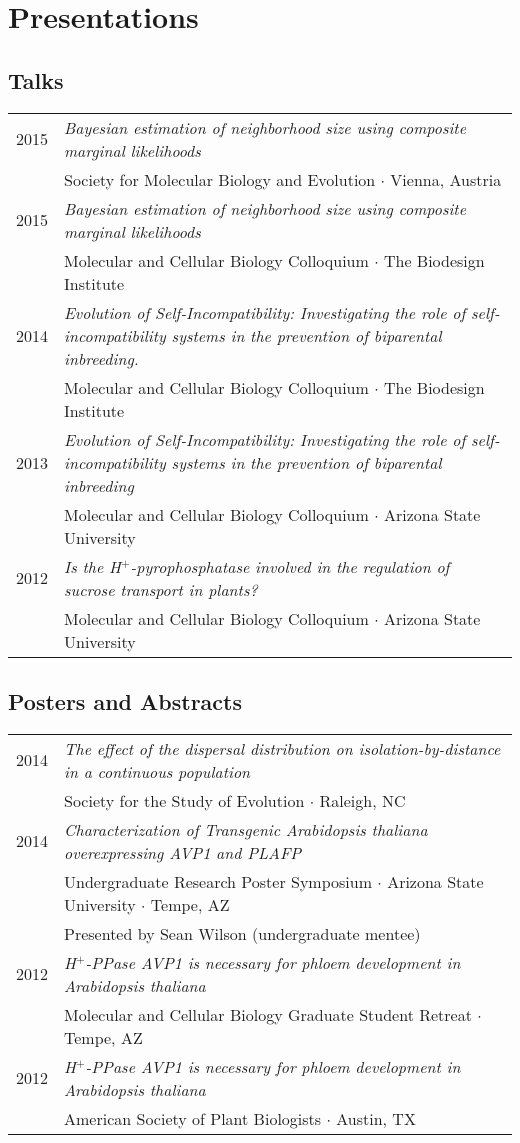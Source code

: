 \documentclass[11pt]{article}
\begin{document}
\section*{Presentations}
\subsection*{Talks}
\renewcommand{\arraystretch}{1}
\begin{tabularx}{\linewidth}{l X}
2015&\textit{Bayesian estimation of neighborhood size using composite marginal likelihoods}\\
&Society for Molecular Biology and Evolution $\cdotp$ Vienna, Austria\\
2015&\textit{Bayesian estimation of neighborhood size using composite marginal likelihoods}\\
&Molecular and Cellular Biology Colloquium $\cdot$ The Biodesign Institute\\
2014&\textit{Evolution of Self-Incompatibility: Investigating the role of self-incompatibility systems in the prevention of biparental inbreeding.}\\
&Molecular and Cellular Biology Colloquium $\cdotp$ The Biodesign Institute\\
2013&\textit{Evolution of Self-Incompatibility: Investigating the role of self-incompatibility systems in the prevention of biparental inbreeding}\\
&Molecular and Cellular Biology Colloquium $\cdotp$ Arizona State University\\
2012&\textit{Is the H$^+$-pyrophosphatase involved in the regulation of sucrose transport in plants?}\\
&Molecular and Cellular Biology Colloquium $\cdotp$ Arizona State University\\
\end{tabularx}
\subsection*{Posters and Abstracts}
\begin{tabularx}{\linewidth}{l X}
2014&\textit{The effect of the dispersal distribution on isolation-by-distance in a continuous population}\\
&Society for the Study of Evolution $\cdotp$ Raleigh, NC\\
2014&\textit{Characterization of Transgenic Arabidopsis thaliana overexpressing AVP1 and PLAFP}\\
&Undergraduate Research Poster Symposium $\cdotp$ Arizona State University $\cdotp$ Tempe, AZ\\
&Presented by Sean Wilson (undergraduate mentee)\\
2012&\textit{H$^+$-PPase AVP1 is necessary for phloem development in Arabidopsis thaliana}\\
&Molecular and Cellular Biology Graduate Student Retreat $\cdotp$ Tempe, AZ\\
2012&\textit{H$^+$-PPase AVP1 is necessary for phloem development in Arabidopsis thaliana}\\
&American Society of Plant Biologists $\cdotp$ Austin, TX\\
\end{tabularx}
\end{document}
